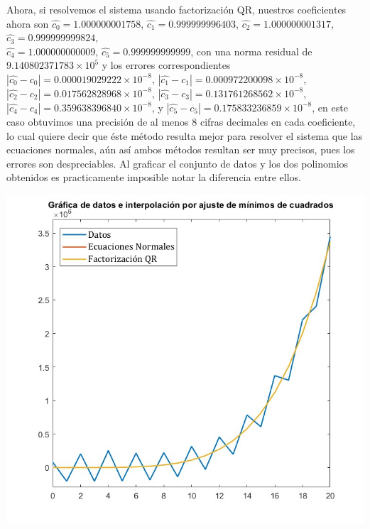 \begin{solution}
Ahora, si resolvemos el sistema usando factorización QR, nuestros coeficientes ahora son $\hat{c_0}=1.000000001758$, $\hat{c_1}=0.999999996403$, $\hat{c_2}=1.000000001317$, $\hat{c_3}=0.999999999824$, \\ $\hat{c_4}=1.000000000009$, $\hat{c_5}=0.999999999999$, con una norma residual de $9.140802371783\times 10^{5}$ y los errores correspondientes $|\hat{c_0}-c_0|= 0.000019029222\times 10^{-8}$, $|\hat{c_1}-c_1|=0.000972200098 \times 10^{-8}$, $|\hat{c_2}-c_2|= 0.017562828968\times 10^{-8}$, $|\hat{c_3}-c_3|=0.131761268562 \times 10^{-8}$, $|\hat{c_4}-c_4|= 0.359638396840\times 10^{-8}$, y $|\hat{c_5}-c_5|= 0.175833236859\times 10^{-8}$, en este caso obtuvimos una precisión de al menos 8 cifras decimales en cada coeficiente, lo cual quiere decir que éste método resulta mejor para resolver el sistema que las ecuaciones normales, aún así ambos métodos resultan ser muy precisos, pues los errores son despreciables. Al graficar el conjunto de datos y los dos polinomios obtenidos es practicamente imposible notar la diferencia entre ellos. 
\begin{center}
    \includegraphics[scale=0.4]{Graficas/Punto2.jpg}
\end{center}
\end{solution}